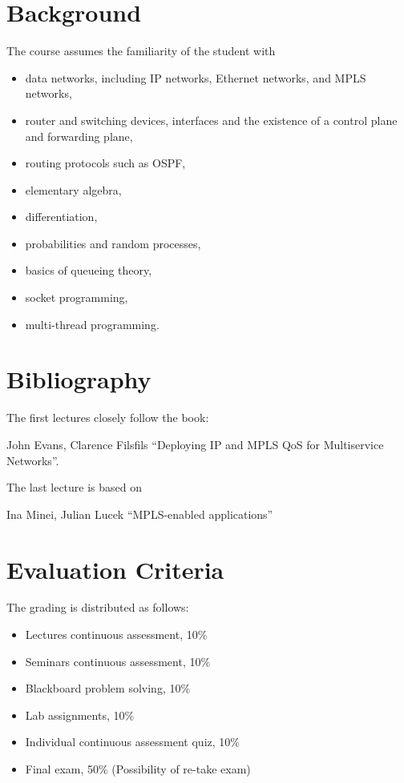 \section{Background}
The course assumes the familiarity of the student with 
\begin{itemize}
\item data networks, including IP networks, Ethernet networks,  and MPLS networks,
\item router and switching devices, interfaces and the existence of a control plane and forwarding plane,
\item routing protocols such as OSPF,
\item elementary algebra,
\item differentiation,
\item probabilities and random processes, 
\item basics of queueing theory,
\item socket programming,
\item multi-thread programming.
\end{itemize}


\section{Bibliography}

The first lectures closely follow the book:

John Evans, Clarence Filsfils ``Deploying IP and MPLS QoS for Multiservice Networks''.

The last lecture is based on 

Ina Minei, Julian Lucek ``MPLS-enabled applications''

\section{Evaluation Criteria}

The grading is distributed as follows:
\begin{itemize}
\item Lectures continuous assessment, 10\%
\item Seminars continuous assessment, 10\%
\item Blackboard problem solving, 10\%
\item Lab assignments, 10\%
\item Individual continuous assessment quiz, 10\%
\item Final exam, 50\% (Possibility of re-take exam)
\end{itemize}

